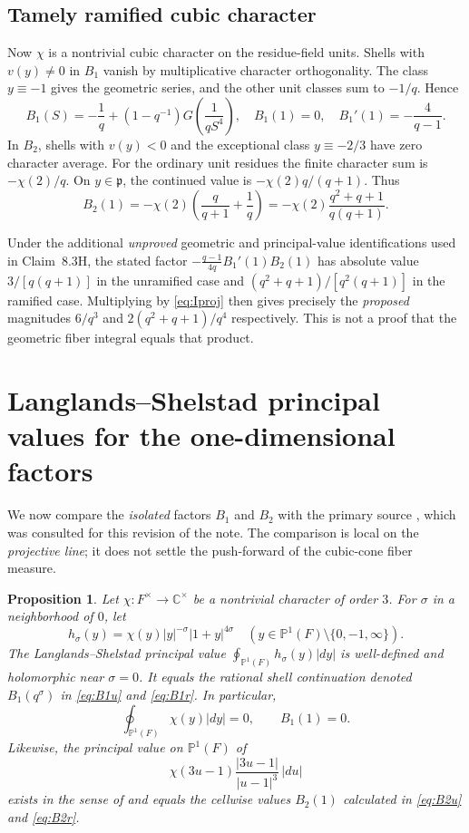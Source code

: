 \documentclass[12pt,letterpaper]{amsart}
\newtheorem{proposition}[lemma]{Proposition}
\begin{document}
\subsection*{Tamely ramified cubic character}
Now $\chi$ is a nontrivial cubic character on the residue-field units. Shells with $v(y)\neq0$ in $B_1$ vanish by multiplicative character orthogonality. The class $y\equiv-1$ gives the geometric series, and the other unit classes sum to $-1/q$. Hence
\begin{equation}\label{eq:B1r}
B_1(S)=-\frac1q+(1-q^{-1})G\!\left(\frac1{qS^4}\right),
\quad B_1(1)=0,\quad B_1'(1)=-\frac4{q-1}.
\end{equation}
In $B_2$, shells with $v(y)<0$ and the exceptional class $y\equiv-2/3$ have zero character average. For the ordinary unit residues the finite character sum is $-\chi(2)/q$. On $y\in\mathfrak p$, the continued value is $-\chi(2)q/(q+1)$. Thus
\begin{equation}\label{eq:B2r}
B_2(1)=-\chi(2)\left(\frac q{q+1}+\frac1q\right)
=-\chi(2)\frac{q^2+q+1}{q(q+1)}.
\end{equation}

Under the additional \emph{unproved} geometric and principal-value identifications used in Claim~8.3H, the stated factor
$-\frac{q-1}{4q}B_1'(1)B_2(1)$ has absolute value
$3/[q(q+1)]$ in the unramified case and $(q^2+q+1)/[q^2(q+1)]$ in the ramified case. Multiplying by \eqref{eq:Iproj} then gives precisely the \emph{proposed} magnitudes $6/q^3$ and $2(q^2+q+1)/q^4$ respectively. This is not a proof that the geometric fiber integral equals that product.


\section{Langlands--Shelstad principal values for the one-dimensional factors}\label{sec:pv}
We now compare the \emph{isolated} factors $B_1$ and $B_2$ with the primary
source \cite[\S1, Lemmas 1.A and 1.C]{LS83}, which was consulted for this
revision of the note. The comparison is local on the \emph{projective line};
it does not settle the push-forward of the cubic-cone fiber measure.

\begin{proposition}\label{prop:local-pv}
Let $\chi:F^\times\to\mathbb C^\times$ be a nontrivial character of order $3$.
For $\sigma$ in a neighborhood of $0$, let
\[
 h_\sigma(y)=\chi(y)|y|^{-\sigma}|1+y|^{4\sigma}
 \quad(y\in\mathbb P^1(F)\setminus\{0,-1,\infty\}).
\]
The Langlands--Shelstad principal value
$\oint_{\mathbb P^1(F)}h_\sigma(y)|dy|$ is well-defined and holomorphic
near $\sigma=0$. It equals the rational shell continuation denoted
$B_1(q^\sigma)$ in \eqref{eq:B1u} and \eqref{eq:B1r}. In particular,
\[
 \oint_{\mathbb P^1(F)}\chi(y)|dy|=0,
 \qquad B_1(1)=0.
\]
Likewise, the principal value on $\mathbb P^1(F)$ of
\[
 \chi(3u-1)\frac{|3u-1|}{|u-1|^3}\,|du|
\]
exists in the sense of \cite[\S1]{LS83} and equals the cellwise values
$B_2(1)$ calculated in \eqref{eq:B2u} and \eqref{eq:B2r}.
\end{proposition}
\end{document}

